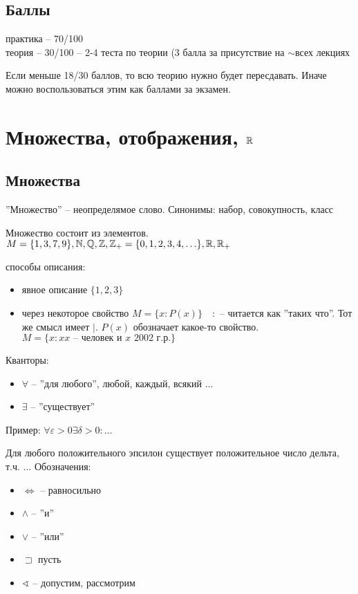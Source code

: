     \section{Баллы}

    практика -- 70/100\\
    теория -- 30/100 -- 2-4 теста по теории (3 балла за присутствие на $\sim $всех лекциях

    Если меньше 18/30 баллов, то всю теорию нужно будет пересдавать. Иначе можно воспользоваться этим как баллами за экзамен.

    \chapter{Множества, отображения, $\mathbb{R}$}

    \section{Множества}
    ''Множество'' -- неопределямое слово. Синонимы: набор, совокупность, класс

    Множество состоит из элементов. $M = \{1,3,7,9\}, \mathbb{N} , \mathbb{Q}, \mathbb{Z} , \mathbb{Z}_+ = \{0,1,2,3,4,\ldots\}, \mathbb{R}, \mathbb{R}_+$

    способы описания:
    \begin{itemize}
        \item явное описание $\{1, 2, 3\}$
        \item через некоторое свойство $M = \{x: P(x)\}\quad :$ -- читается как ''таких что''. Тот же смысл имеет $\mid$.
            $P(x)$ обозначает какое-то свойство.
            $M = \{x:x\text{$x$ -- человек и $x$ 2002 г.р.}\}$
    \end{itemize}
    Кванторы:
    \begin{itemize}
        \item $\forall $ -- ''для любого'', любой, каждый, всякий $\ldots$
        \item $\exists $ -- ''существует''
    \end{itemize}

    Пример: $\forall \varepsilon>0 \exists  \delta>0 :\ldots$

   Для любого положительного эпсилон существует положительное число дельта, т.ч. $\ldots$
    Обозначения:
    \begin{itemize}
        \item $\iff $ -- равносильно
        \item $\wedge$ -- ''и''
        \item $\vee$ -- ''или''
        \item $\sqsupset $ пусть
        \item $\sphericalangle$ -- допустим, рассмотрим
    \end{itemize}

